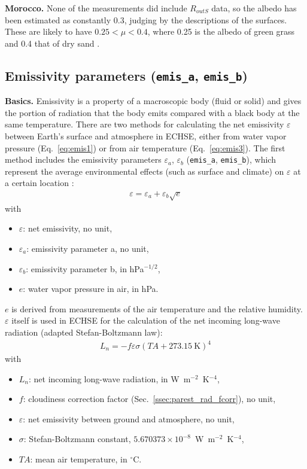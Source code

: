 \documentclass{scrreprt}
\newenvironment{denseitem}{
  \begin{itemize}
    \setlength{\itemsep}{0pt}
    \setlength{\parskip}{0pt}
    \setlength{\parsep}{0pt}
}{
  \end{itemize}
}
\begin{document}
\textbf{Morocco.}
None of the measurements did include $R_{outS}$ data, so the albedo has been estimated as constantly 0.3, judging by the descriptions of the surfaces.
These are likely to have $0.25 < \mu < 0.4$, where 0.25 is the albedo of green grass \citep{markvart03} and 0.4 that of dry sand \citep{tetzlaff83}.

\subsection{Emissivity parameters (\texttt{emis\_a}, \texttt{emis\_b})} \label{ssec:parest_rad_emis}

\textbf{Basics.}
Emissivity is a property of a macroscopic body (fluid or solid) and gives the portion of radiation that the body emits compared with a black body at the same temperature.
There are two methods for calculating the net emissivity $\varepsilon$ between Earth's surface and atmosphere in ECHSE, either from water vapor pressure (Eq.~\ref{eq:emis1}) or from air temperature (Eq.~\ref{eq:emis3}).
The first method includes the emissivity parameters $\varepsilon_a$, $\varepsilon_b$ (\verb!emis_a!, \verb!emis_b!), which represent the average environmental effects (such as surface and climate) on $\varepsilon$ at a certain location \citep{brunt32}:
\begin{align} \label{eq:emis1}
  \varepsilon = \varepsilon_a + \varepsilon_b \sqrt{e}
\end{align}
%
with
\begin{denseitem}
  \item[] $\varepsilon$: net emissivity, no unit,
  \item[] $\varepsilon_a$: emissivity parameter a, no unit,
  \item[] $\varepsilon_b$: emissivity parameter b, in hPa$^{-1/2}$,
  \item[] $e$: water vapor pressure in air, in hPa.
\end{denseitem}
%
$e$ is derived from measurements of the air temperature and the relative humidity.
$\varepsilon$ itself is used in ECHSE for the calculation of the net incoming long-wave radiation (adapted Stefan-Boltzmann law):
\begin{align} \label{eq:emis2}
  L_n = -f \varepsilon \sigma (TA + 273.15~\text{K})^4
\end{align}
%
with
\begin{denseitem}
  \item[] $L_n$: net incoming long-wave radiation, in W~m$^{-2}$~K$^{-4}$,
  \item[] $f$: cloudiness correction factor (Sec.~\ref{ssec:parest_rad_fcorr}), no unit,
  \item[] $\varepsilon$: net emissivity between ground and atmosphere, no unit,
  \item[] $\sigma$: Stefan-Boltzmann constant, $5.670373 \times 10^{-8}$~W~m$^{-2}$~K$^{-4}$,
  \item[] ${TA}$: mean air temperature, in $^\circ$C.
\end{denseitem}
\end{document}
